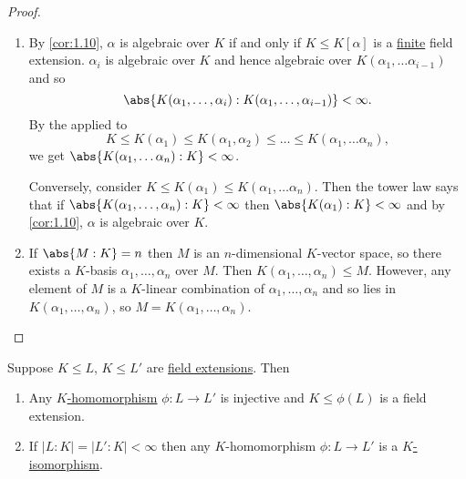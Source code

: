 \documentclass{article}
\begin{document}
\begin{proof} \leavevmode
    \begin{enumerate}[label=(\roman*)]
        \item By \cref{cor:1.10}, $\alpha$ is algebraic over $K$ if and only if $K \leq K[\alpha]$ is a \hyperlink{def:degreeOfFieldExt}{finite} field extension.
            $\alpha_i$ is algebraic over $K$ and hence algebraic over $K(\alpha_1, \dotsc \alpha_{i-1})$ and so
            \begin{equation*}\abs{K(\alpha_1, \dotsc, \alpha_i):K(\alpha_1, \dotsc, \alpha_{i-1})} < \infty.\end{equation*}
            By the  applied to
            \begin{equation*}K \leq K(\alpha_1) \leq K(\alpha_1, \alpha_2) \leq \dots \leq K(\alpha_1, \dotsc \alpha_n),\end{equation*} we get $\abs{K(\alpha_1, \dotsc \alpha_n):K} < \infty$.

            Conversely, consider $K \leq K(\alpha_1) \leq K(\alpha_1, \dotsc \alpha_n)$.
            Then the tower law says that if $\abs{K(\alpha_1, \dotsc, \alpha_n): K} < \infty$ then $\abs{K(\alpha_1):K} < \infty$ and by \cref{cor:1.10}, $\alpha$ is algebraic over $K$.

        \item If $\abs{M:K} = n$ then $M$ is an $n$-dimensional $K$-vector space, so there exists a $K$-basis $\alpha_1, \dotsc, \alpha_n$ over $M$.
            Then $K(\alpha_1, \dotsc, \alpha_n) \leq M$.
            However, any element of $M$ is a $K$-linear combination of $\alpha_1, \dotsc, \alpha_n$ and so lies in $K(\alpha_1, \dotsc, \alpha_n)$, so $M = K(\alpha_1, \dotsc, \alpha_n)$. \qedhere
    \end{enumerate}
\end{proof}



\begin{nlemma}\label{lem:1.21}
    Suppose $K \leq L$, $K \leq L'$ are \hyperlink{def:fieldExt}{field extensions}. Then
    \begin{enumerate}[label=(\roman*)]
        \item Any \hyperlink{def:homo}{$K$-homomorphism} $\phi:L \to L'$ is injective and $K \leq \phi(L)$ is a field extension.
        \item If $|L:K| = |L':K| < \infty$ then any $K$-homomorphism $\phi:L \to L'$ is a \hyperlink{def:homo}{$K$-isomorphism}.
    \end{enumerate}
\end{nlemma}
\end{document}

